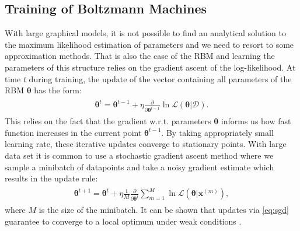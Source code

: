 \documentclass[../report/report.tex]{subfiles}
\begin{document}
\subsection{Training of Boltzmann Machines}
With large graphical models, it is not possible to find an analytical solution to the maximum likelihood estimation of parameters and we need to resort to some approximation methods. That is also the case of the RBM and learning the parameters of this structure relies on the gradient ascent of the log-likelihood. At time $t$ during training, the update of the vector containing all parameters of the RBM $\mathbf{\theta}$ has the form:
\begin{align}
\begin{split}
\mathbf{\theta}^{t} = \mathbf{\theta}^{t-1} + \eta  \frac{\partial}{\partial \mathbf{\theta}^{t-1}}  \ln \mathcal{L}(\mathbf{\theta}| \mathcal{D}). 
\end{split}
\end{align}
This relies on the fact that the gradient w.r.t. parameters $\mathbf{\theta}$ informs us how fast function increases in the current point $\mathbf{\theta}^{t-1}$. 
By taking appropriately small learning rate, these iterative updates converge to stationary points. With large data set it is common to use a stochastic gradient ascent method \cite{robbins1951stochastic} where we sample a minibatch of datapoints and take a noisy gradient estimate which results in the update rule:
\begin{align}
\begin{split}
\mathbf{\theta}^{t+1} = \mathbf{\theta}^{t} + \eta \frac{1}{M} \frac{\partial}{\partial \mathbf{\theta}^t}  \sum_{m =1}^{M} \ln \mathcal{L}(\mathbf{\theta}| \mathbf{x}^{(m)}),
\end{split}
\label{eq:sgd}
\end{align}
where $M$ is the size of the minibatch. It can be shown that updates via \ref{eq:sgd} guarantee to converge to a local optimum under weak conditions \cite{bottou1998online}.
\end{document}
